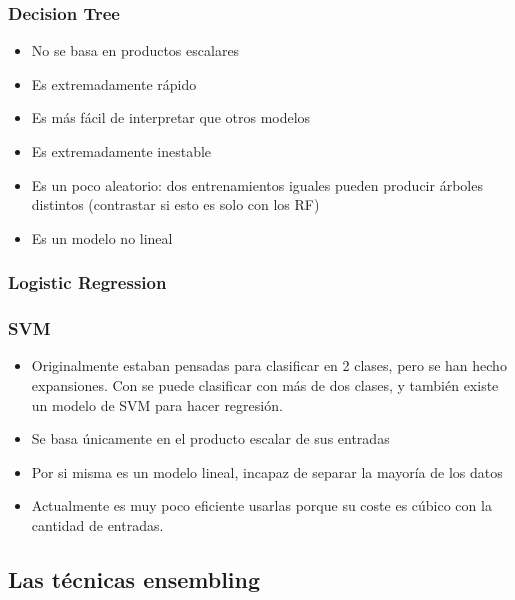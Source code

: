 \subsubsection{Decision Tree}
  \begin{note}
    \begin{itemize}
      \item No se basa en productos escalares
      \item Es extremadamente rápido
      \item Es más fácil de interpretar que otros modelos
      \item Es extremadamente inestable
      \item Es un poco aleatorio: dos entrenamientos iguales pueden producir
      árboles distintos (contrastar si esto es solo con los RF)
      \item Es un modelo no lineal
    \end{itemize}
  \end{note}
\subsubsection{Logistic Regression}
\subsubsection{SVM}
  \begin{note}
    \begin{itemize}
      \item Originalmente estaban pensadas para clasificar en 2 clases, pero se
      han hecho expansiones. Con  se puede clasificar con
      más de dos clases, y también existe un modelo de SVM para hacer regresión.
      \item Se basa únicamente en el producto escalar de sus entradas
      \item Por si misma es un modelo lineal, incapaz de separar la mayoría de
      los datos
      \item Actualmente es muy poco eficiente usarlas porque su coste es
      cúbico con la cantidad de entradas.
    \end{itemize}
  \end{note}
\subsection{Las técnicas ensembling}

